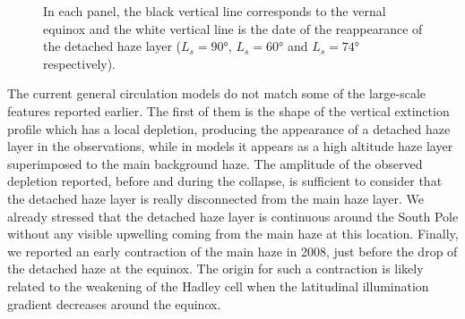 \begin{figure}[!ht]
\caption{
In each panel, the black vertical line corresponds to the vernal equinox 
and the white vertical line is the date of the reappearance of the detached haze layer ($L_s = \ang{90}$, $L_s = \ang{60}$ and $L_s = \ang{74}$ respectively).}
\label{fig:gcm_cycle}
\end{figure}

The current general circulation models do not match some of the large-scale features reported earlier. The first of them
is the shape of the vertical extinction profile which has a local depletion, producing the appearance of a detached haze layer in the
observations, while in models it appears as a high altitude haze layer superimposed to the main background haze.
The amplitude of the observed depletion reported, before and during the collapse, is sufficient to consider that the
detached haze layer is really disconnected from the main haze layer. We already stressed that the detached haze layer is
continuous around the South Pole without any visible upwelling coming from the main haze at this location. Finally, we
reported an early contraction of the main haze in 2008, just before the drop of the detached haze at the equinox. The origin
for such a contraction is likely related to the weakening of the Hadley cell when the latitudinal illumination gradient
decreases around the equinox.

